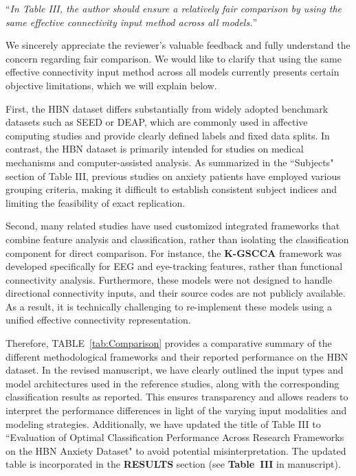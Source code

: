 \documentclass[12pt,technote,onecolumn]{IEEEtran}
\begin{document}
\vspace{4mm}

 ``{\it In Table III, the author should ensure a relatively fair comparison by using the same effective connectivity input method across all models.}''
\vspace{1mm}

We sincerely appreciate the reviewer’s valuable feedback and fully understand the concern regarding fair comparison. We would like to clarify that using the same effective connectivity input method across all models currently presents certain objective limitations, which we will explain below.

First, the HBN dataset differs substantially from widely adopted benchmark datasets such as SEED or DEAP, which are commonly used in affective computing studies and provide clearly defined labels and fixed data splits\cite{geng2025deep}. In contrast, the HBN dataset is primarily intended for studies on medical mechanisms and computer-assisted analysis. As summarized in the ``Subjects" section of Table III, previous studies on anxiety patients have employed various grouping criteria, making it difficult to establish consistent subject indices and limiting the feasibility of exact replication.

Second, many related studies have used customized integrated frameworks that combine feature analysis and classification, rather than isolating the classification component for direct comparison. For instance, the \textbf{K-GSCCA} framework was developed specifically for EEG and eye-tracking features, rather than functional connectivity analysis\cite{guo2020anxiety}. Furthermore, these models were not designed to handle directional connectivity inputs, and their source codes are not publicly available. As a result, it is technically challenging to re-implement these models using a unified effective connectivity representation.

Therefore, TABLE~\ref{tab:Comparison} provides a comparative summary of the different methodological frameworks and their reported performance on the HBN dataset. In the revised manuscript, we have clearly outlined the input types and model architectures used in the reference studies, along with the corresponding classification results as reported. This ensures transparency and allows readers to interpret the performance differences in light of the varying input modalities and modeling strategies. Additionally, we have updated the title of Table III to ``Evaluation of Optimal Classification Performance Across Research Frameworks on the HBN Anxiety Dataset" to avoid potential misinterpretation. The updated table is incorporated in the \textbf{RESULTS} section (see \textbf{Table~III} in manuscript).
\end{document}
